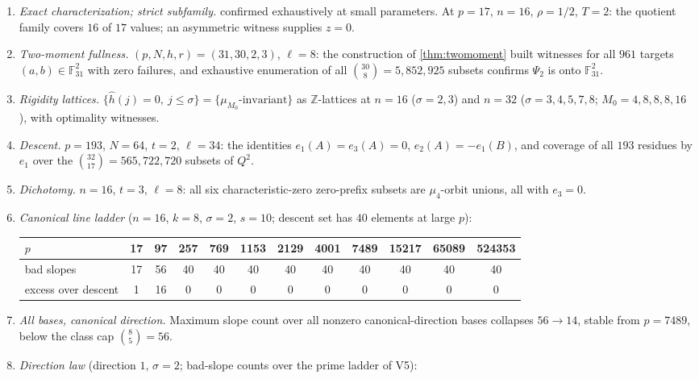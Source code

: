 \documentclass[11pt]{article}
\theoremstyle{definition}
\newcommand{\F}{\mathbb F}
\newcommand{\Z}{\mathbb Z}
\begin{document}
\begin{enumerate}[label=V\arabic*.,leftmargin=2.4em]
\item\emph{Exact characterization; strict subfamily.}   confirmed exhaustively at small parameters.  At $p=17$, $n=16$, $\rho=1/2$, $T=2$: the quotient family covers $16$ of $17$ values; an asymmetric witness supplies $z=0$.
\item\emph{Two-moment fullness.}  $(p,N,h,r)=(31,30,2,3)$, $\ell=8$: the construction of \cref{thm:twomoment} built witnesses for all $961$ targets $(a,b)\in\F_{31}^2$ with zero failures, and exhaustive enumeration of all $\binom{30}8=5{,}852{,}925$ subsets confirms $\Psi_2$ is onto $\F_{31}^2$.
\item\emph{Rigidity lattices.}  $\{\widehat h(j)=0,\ j\le\sigma\}=\{\mu_{M_0}\text{-invariant}\}$ as $\Z$-lattices at $n=16$ ($\sigma=2,3$) and $n=32$ ($\sigma=3,4,5,7,8$; $M_0=4,8,8,8,16$), with optimality witnesses.
\item\emph{Descent.}  $p=193$, $N=64$, $t=2$, $\ell=34$: the identities $e_1(A)=e_3(A)=0$, $e_2(A)=-e_1(B)$, and coverage of all $193$ residues by $e_1$ over the $\binom{32}{17}=565{,}722{,}720$ subsets of $Q^2$.
\item\emph{Dichotomy.}  $n=16$, $t=3$, $\ell=8$: all six characteristic-zero zero-prefix subsets are $\mu_4$-orbit unions, all with $e_3=0$.
\item\emph{Canonical line ladder} ($n=16$, $k=8$, $\sigma=2$, $s=10$; descent set has $40$ elements at large $p$):
\begin{center}\small
\begin{tabular}{lccccccccccc}
\toprule
$p$ & 17 & 97 & 257 & 769 & 1153 & 2129 & 4001 & 7489 & 15217 & 65089 & 524353\\
\midrule
bad slopes & 17 & 56 & 40 & 40 & 40 & 40 & 40 & 40 & 40 & 40 & 40\\
excess over descent & 1 & 16 & 0 & 0 & 0 & 0 & 0 & 0 & 0 & 0 & 0\\
\bottomrule
\end{tabular}
\end{center}
\item\emph{All bases, canonical direction.}  Maximum slope count over all nonzero canonical-direction bases collapses $56\to14$, stable from $p=7489$, below the class cap $\binom85=56$.
\item\emph{Direction law} (direction $1$, $\sigma=2$; bad-slope counts over the prime ladder of V5):
\begin{center}\small
\begin{tabular}{lccccccccccc}

\end{tabular}
\end{center}
\end{enumerate}
\end{document}
